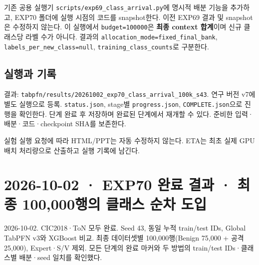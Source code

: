기존 공용 실행기 \texttt{scripts/\allowbreak{}\allowbreak{}exp69\_\allowbreak{}\allowbreak{}cl\allowbreak{}ass\_\allowbreak{}\allowbreak{}arri\allowbreak{}val.\allowbreak{}py}에 명시적 배분 기능을 추가하고, EXP70 폴더에 실행 시점의 코드를 snapshot한다. 이전 EXP69 결과 및 snapshot은 수정하지 않는다. 이 실행에서 \texttt{budget=\allowbreak{}\allowbreak{}1\allowbreak{}00000}은 \textbf{최종 context 합계}이며 신규 클래스당 라벨 수가 아니다. 결과의 \texttt{allocati\allowbreak{}on\_\allowbreak{}\allowbreak{}mode=\allowbreak{}\allowbreak{}fixed\_\allowbreak{}\allowbreak{}fi\allowbreak{}nal\_\allowbreak{}\allowbreak{}bank\allowbreak{}}, \texttt{labels\_\allowbreak{}\allowbreak{}p\allowbreak{}er\_\allowbreak{}\allowbreak{}new\_\allowbreak{}\allowbreak{}c\allowbreak{}lass=\allowbreak{}\allowbreak{}nul\allowbreak{}l}, \texttt{training\allowbreak{}\_\allowbreak{}\allowbreak{}class\_\allowbreak{}\allowbreak{}c\allowbreak{}ounts}로 구분한다.

\subsection{실행과 기록}
결과: \texttt{tabpfn/\allowbreak{}\allowbreak{}r\allowbreak{}esults/\allowbreak{}\allowbreak{}2\allowbreak{}0261002\_\allowbreak{}\allowbreak{}exp70\_\allowbreak{}\allowbreak{}cl\allowbreak{}ass\_\allowbreak{}\allowbreak{}arri\allowbreak{}val\_\allowbreak{}\allowbreak{}100k\allowbreak{}\_\allowbreak{}\allowbreak{}s43}. 연구 버전 v7에 별도 실행으로 등록. \texttt{status.\allowbreak{}j\allowbreak{}son}, stage별 \texttt{progress\allowbreak{}.\allowbreak{}json}, \texttt{COMPLETE\allowbreak{}.\allowbreak{}json}으로 진행을 확인한다. 단계 완료 후 저장하며 완료된 단계에서 재개할 수 있다. 준비한 입력·배분·코드·checkpoint SHA를 보존한다.

실험 실행 요청에 따라 HTML/\allowbreak{}PPT는 자동 수정하지 않는다. ETA는 최초 실제 GPU 배치 처리량으로 산출하고 실행 기록에 남긴다.



\section{2026-10-02 · EXP70 완료 결과 · 최종 100,000행의 클래스 순차 도입}
\label{report:20261002_exp70_results}
2026-10-02. CIC2018·ToN 모두 완료. Seed 43, 동일 누적 train/\allowbreak{}test IDs, Global TabPFN v3와 XGBoost 비교. 최종 데이터셋별 100,000행(Benign 75,000 +\allowbreak{} 공격 25,000), Expert·S/\allowbreak{}V 제외. 모든 단계의 완료 마커와 두 방법의 train/\allowbreak{}test IDs·클래스별 배분·seed 일치를 확인했다.

